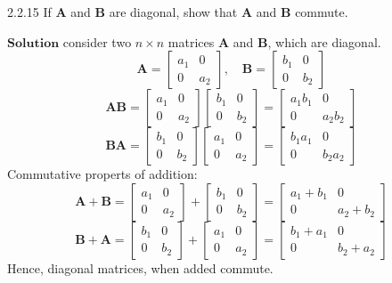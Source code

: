 \documentclass{styles/kaobook}
\begin{document}
\begin{greenbox}{2.2.15}
If $\mathbf{A}$ and $\mathbf{B}$ are diagonal, show that $\mathbf{A}$ and $\mathbf{B}$ commute.
\end{greenbox}

$\boxed{\textbf{Solution}}$  consider two $n\times n$ matrices $\mathbf{A}$ and $\mathbf{B}$, which are diagonal.
$$\mathbf{A}=\left[\begin{array}{ll}{a_{1}} & {0} \\ {0} & {a_{2}}\end{array}\right], \quad \mathbf{B}=\left[\begin{array}{ll}{b_{1}} & {0} \\ {0} & {b_{2}}\end{array}\right]$$
$$\mathbf{A} \mathbf{B}=\left[\begin{array}{ll}{a_{1}} & {0} \\ {0} & {a_{2}}\end{array}\right]\left[\begin{array}{ll}{b_{1}} & {0} \\ {0} & {b_{2}}\end{array}\right]=\left[\begin{array}{cc}{a_{1} b_{1}} & {0} \\ {0} & {a_{2} b_{2}}\end{array}\right]$$
$$\mathbf{B} \mathbf{A}=\left[\begin{array}{ll}{b_{1}} & {0} \\ {0} & {b_{2}}\end{array}\right]\left[\begin{array}{ll}{a_{1}} & {0} \\ {0} & {a_{2}}\end{array}\right]=\left[\begin{array}{lll}{b_{1} a_{1}} & {0} \\ {0} & {b_{2} a_{2}}\end{array}\right]$$
Commutative properts of addition:
$$\mathbf{A}+\mathbf{B}=\left[\begin{array}{ll}{a_{1}} & {0} \\ {0} & {a_{2}}\end{array}\right]+\left[\begin{array}{ll}{b_{1}} & {0} \\ {0} & {b_{2}}\end{array}\right]=\left[\begin{array}{ccc}{a_{1}+b_{1}} & {0} \\ {0} & {a_{2}+b_{2}}\end{array}\right]$$
$$\mathbf{B}+\mathbf{A}=\left[\begin{array}{ll}{b_{1}} & {0} \\ {0} & {b_{2}}\end{array}\right]+\left[\begin{array}{ll}{a_{1}} & {0} \\ {0} & {a_{2}}\end{array}\right]=\left[\begin{array}{cc}{b_{1}+a_{1}} & {0} \\ {0} & {b_{2}+a_{2}}\end{array}\right]$$
Hence, diagonal matrices, when added commute.
\end{document}
